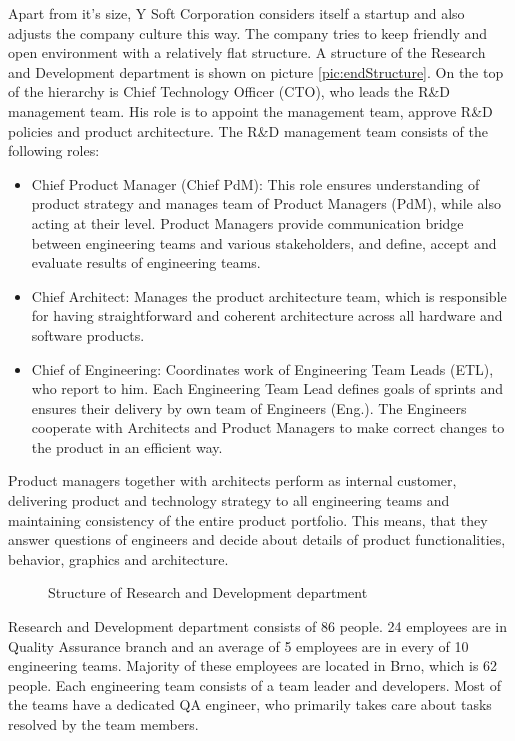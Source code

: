 \documentclass[11pt,singleside]{myfithesis2}
\newcommand{\pict}[4]{
	\begin{figure}[h!]
  		\vspace{-7px}
  		\centerline{\fcolorbox{darkgray}{palegray}{\texttt{[image: \#2]}}}
  		\caption{#1}
  		\label{#4}
	\end{figure}
}
\begin{document}
Apart from it's size, Y Soft Corporation considers itself a startup and also adjusts the company culture this way. The company tries to keep friendly and open environment with a relatively flat structure. A structure of the Research and Development department is shown on picture \ref{pic:endStructure}. On the top of the hierarchy is Chief Technology Officer (CTO), who leads the R\&D management team. His role is to appoint the management team, approve R\&D policies and product architecture. The R\&D management team consists of the following roles:
\begin{itemize}
	\item{Chief Product Manager (Chief PdM):} This role ensures understanding of product strategy and manages team of Product Managers (PdM), while also acting at their level. Product Managers provide communication bridge between engineering teams and various stakeholders, and define, accept and evaluate results of engineering teams.
	\item{Chief Architect:} Manages the product architecture team, which is responsible for having straightforward and coherent architecture across all hardware and software products.  
	\item{Chief of Engineering:} Coordinates work of Engineering Team Leads (ETL), who report to him. Each Engineering Team Lead defines goals of sprints and ensures their delivery by own team of Engineers (Eng.). The Engineers cooperate with Architects and Product Managers to make correct changes to the product in an efficient way.
\end{itemize}
Product managers together with architects perform as internal customer, delivering product and technology strategy to all engineering teams and maintaining consistency of the entire product portfolio. This means, that they answer questions of engineers and decide about details of product functionalities, behavior, graphics and architecture. 

\pict{Structure of Research and Development department}{data/rndStructure.png}{width=1\textwidth}{pic:rndStructure}

Research and Development department consists of 86 people. 24 employees are in Quality Assurance branch and an average of 5 employees are in every of 10 engineering teams. Majority of these employees are located in Brno, which is 62 people. Each engineering team consists of a team leader and developers. Most of the teams have a dedicated QA engineer, who primarily takes care about tasks resolved by the team members.
\end{document}
